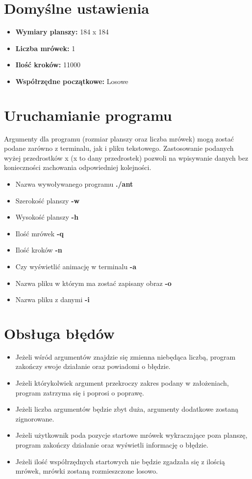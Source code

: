 \documentclass[a4paper,12pt]{article}
\begin{document}
\section{Domyślne ustawienia}
\begin{itemize}
\item \textbf{Wymiary planszy:} 184 x 184
\item \textbf{Liczba mrówek:} 1
\item \textbf{Ilość kroków:} 11000
\item \textbf{Współrzędne początkowe:} Losowe
\end{itemize}
\section{Uruchamianie programu}
Argumenty dla programu (rozmiar planszy oraz liczba mrówek) mogą zostać podane zarówno z terminalu, jak i pliku tekstowego. Zastosowanie podanych wyżej przedrostków x (x to dany przedrostek) pozwoli na wpisywanie danych bez konieczności zachowania odpowiedniej kolejności.
\begin{itemize}
\item Nazwa wywoływanego programu \textbf{./ant}
\item Szerokość planszy \textbf{-w}
\item Wysokość planszy \textbf{-h}
\item Ilość mrówek \textbf{-q}
\item Ilość kroków \textbf{-n}
\item Czy wyświetlić animację w terminalu \textbf{-a}
\item Nazwa pliku w którym ma zostać zapisany obraz \textbf{-o}
\item Nazwa pliku z danymi \textbf{-i}
\end{itemize}
\newpage
\section{Obsługa błędów}
\begin{itemize}
\item Jeżeli wśród argumentów znajdzie się zmienna niebędąca liczbą, program zakończy swoje działanie oraz powiadomi o błędzie.
\item Jeżeli którykolwiek argument przekroczy zakres podany w założeniach, program zatrzyma się i poprosi o poprawę.
\item Jeżeli liczba argumentów będzie zbyt duża, argumenty dodatkowe zostaną zignorowane.
\item Jeżeli użytkownik poda pozycje startowe mrówek wykraczające poza planszę, program zakończy działanie oraz wyświetli informację o błędzie.
\item Jeżeli ilość współrzędnych startowych nie będzie zgadzała się z ilością mrówek, mrówki zostaną rozmieszczone losowo.
\end{itemize}
\end{document}

